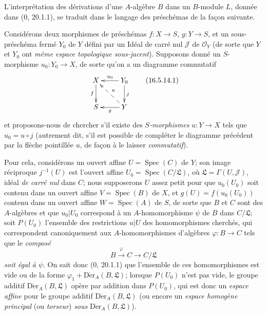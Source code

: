 \begin{env}[16.5.14]
\label{IV.16.5.14}
L'interprétation des dérivations d'une $A$-algèbre $B$ dans un $B$-module
$L$, donnée dans (0, 20.1.1), se traduit dans le langage des préschémas de la
façon suivante.

Considérons deux morphismes de préschémas $f:X\to S$, $g:Y\to S$, et un
sous-préschéma fermé $Y_0$ de $Y$ défini par un Idéal de carré nul
$\mathscr{J}$ de $\mathcal{O}_Y$ (de sorte que $Y$ et $Y_0$ ont
\emph{même espace topologique sous-jacent}). Supposons donné un $S$-morphisme
$u_0:Y_0\to X$, de sorte qu'on a un diagramme commutatif
\[
  \xymatrix{
    X\ar[d]_-f & Y_0\ar[l]_-{u_0}\ar[d]^j\\
    S & Y\ar@{-->}[ul]_-u\ar[l]^-g
  }
  \tag{16.5.14.1}
  \label{IV.16.5.14.1}
\]
et proposons-nous de chercher s'il existe des \emph{$S$-morphismes}
$u:Y\to X$ tels que $u_0=u\circ j$ (autrement dit, s'il est possible de
compléter le diagramme précédent par la flèche pointillée $u$, de façon à le
laisser \emph{commutatif}).

Pour cela, considérons un ouvert affine $U=\operatorname{Spec}(C)$ de $Y$;
son image réciproque $j^{-1}(U)$ est l'ouvert affine
$U_0=\operatorname{Spec}(C/\mathfrak{L})$, où
$\mathfrak{L}=\Gamma(U,\mathscr{J})$, idéal \emph{de carré nul} dans $C$;
nous supposerons $U$ assez petit pour que $u_0(U_0)$ soit contenu dans un
ouvert affine $V=\operatorname{Spec}(B)$ de $X$, et
$g(U)=f(u_0(U_0))$ contenu dans un ouvert affine
$W=\operatorname{Spec}(A)$ de $S$, de sorte que $B$ et $C$ sont des
$A$-algèbres et que $u_0|U_0$ correspond à un $A$-homomorphisme $\psi$ de
$B$ dans $C/\mathfrak{L}$; soit $P(U_0)$ l'ensemble des restrictions $u|U$
des homomorphismes cherchés, qui correspondent canoniquement aux
$A$-homomorphismes d'algèbres $\varphi:B\to C$ tels que le \emph{composé}
\[
  B\xrightarrow{\varphi}C\longrightarrow C/\mathfrak{L}
\]
\emph{soit égal à $\psi$}. On sait donc (0, 20.1.1) que l'ensemble de ces
homomorphismes est vide ou de la forme
$\varphi_1+\operatorname{D\acute{e}r}_A(B,\mathfrak{L})$; lorsque $P(U_0)$ n'est pas
vide, le groupe additif $\operatorname{D\acute{e}r}_A(B,\mathfrak{L})$ opère par
addition dans $P(U_0)$, qui est donc un \emph{espace affine} pour le groupe
additif $\operatorname{D\acute{e}r}_A(B,\mathfrak{L})$ (ou encore un
\emph{espace homogène principal} (ou \emph{torseur}) \emph{sous}
$\operatorname{D\acute{e}r}_A(B,\mathfrak{L})$).


\end{env}
